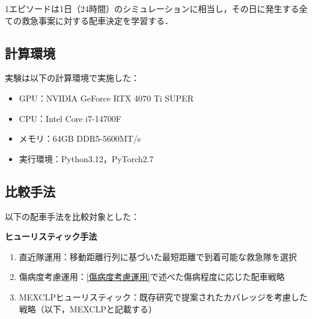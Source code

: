 \begin{table}[H]
    \centering
    \caption{各モデルの学習期間および設定}
    \label{tab:モデルの学習期間と設定}
\end{table}
1エピソードは1日（24時間）のシミュレーションに相当し，その日に発生する全ての救急事案に対する配車決定を学習する．

\subsection{計算環境}
実験は以下の計算環境で実施した：
\begin{itemize}
  \item GPU：NVIDIA GeForce RTX 4070 Ti SUPER
  \item CPU：Intel Core i7-14700F
  \item メモリ：64GB DDR5-5600MT/s
  \item 実行環境：Python3.12，PyTorch2.7
\end{itemize}

\subsection{比較手法}
以下の配車手法を比較対象とした：

\noindent\textbf{ヒューリスティック手法}
\begin{enumerate}[label=\arabic*., leftmargin=*]
    \item 直近隊運用：移動距離行列に基づいた最短距離で到着可能な救急隊を選択
    \item 傷病度考慮運用：\ref{傷病度考慮運用}で述べた傷病程度に応じた配車戦略
    \item MEXCLPヒューリスティック：既存研究\cite{Jagtenberg2017}で提案されたカバレッジを考慮した戦略（以下，MEXCLPと記載する）
\end{enumerate}

